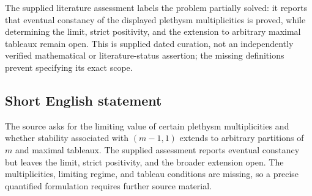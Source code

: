 \documentclass[11pt]{article}
\begin{document}
The supplied literature assessment labels the problem partially solved: it reports that eventual constancy of the displayed plethysm multiplicities is proved, while determining the limit, strict positivity, and the extension to arbitrary maximal tableaux remain open. This is supplied dated curation, not an independently verified mathematical or literature-status assertion; the missing definitions prevent specifying its exact scope.
\subsection{Short English statement}
The source asks for the limiting value of certain plethysm multiplicities and whether stability associated with \((m-1,1)\) extends to arbitrary partitions of \(m\) and maximal tableaux. The supplied assessment reports eventual constancy but leaves the limit, strict positivity, and the broader extension open. The multiplicities, limiting regime, and tableau conditions are missing, so a precise quantified formulation requires further source material.
\end{document}
